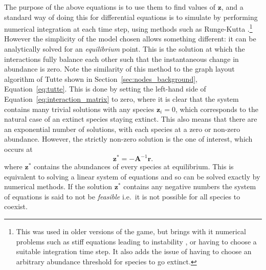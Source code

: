 The purpose of the above equations is to use them to find values of $\mathbf{z}$, and a standard way of doing this for differential equations is to simulate by performing numerical integration at each time step, using methods such as Runge-Kutta \citep{Press2007Runge}.\footnote{This was used in older versions of the game, but brings with it numerical problems such as stiff equations leading to instability \citep{Press2007Runge}, or having to choose a suitable integration time step. It also adds the issue of having to choose an arbitrary abundance threshold for species to go extinct.}
However the simplicity of the model chosen allows something different: it can be analytically solved for an \emph{equilibrium} point. This is the solution at which the interactions fully balance each other such that the instantaneous change in abundance is zero. Note the similarity of this method to the graph layout algorithm of Tutte shown in Section~\ref{sec:nodes_background}, Equation~\eqref{eq:tutte}.
This is done by setting the left-hand side of Equation~\eqref{eq:interaction_matrix} to zero, where it is clear that the system contains many trivial solutions with any species $\mathbf{z}_i=0$, which corresponds to the natural case of an extinct species staying extinct. This also means that there are an exponential number of solutions, with each species at a zero or non-zero abundance.
However, the strictly non-zero solution is the one of interest, which occurs at
\begin{equation}
  \mathbf{z^*} = -\mathbf{A}^{-1}\mathbf{r}.
  \label{eq:equilibrium}
\end{equation}
where $\mathbf{z}^*$ contains the abundances of every species at equilibrium.
This is equivalent to solving a linear system of equations and so can be solved exactly by numerical methods.
If the solution $\mathbf{z^*}$ contains any negative numbers the system of equations is said to not be \emph{feasible} i.e.\ it is not possible for all species to coexist.

